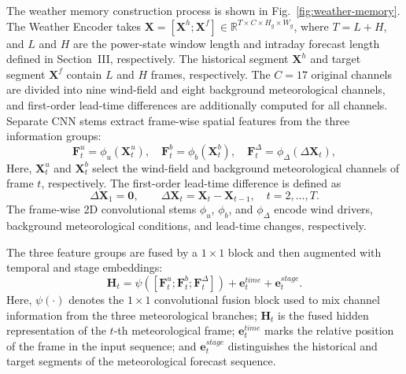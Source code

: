 The weather memory construction process is shown in Fig.~\ref{fig:weather-memory}. The Weather Encoder takes \(\mathbf{X}=[\mathbf{X}^{h};\mathbf{X}^{f}]\in\mathbb{R}^{T\times C\times H_g\times W_g}\), where \(T=L+H\), and \(L\) and \(H\) are the power-state window length and intraday forecast length defined in Section~III, respectively. The historical segment \(\mathbf{X}^{h}\) and target segment \(\mathbf{X}^{f}\) contain \(L\) and \(H\) frames, respectively. The \(C=17\) original channels are divided into nine wind-field and eight background meteorological channels, and first-order lead-time differences are additionally computed for all channels. Separate CNN stems extract frame-wise spatial features from the three information groups:
\begin{equation}
\mathbf{F}^{u}_{t}=\phi_{u}(\mathbf{X}^{u}_{t}),\quad
\mathbf{F}^{b}_{t}=\phi_{b}(\mathbf{X}^{b}_{t}),\quad
\mathbf{F}^{\Delta}_{t}=\phi_{\Delta}(\Delta\mathbf{X}_{t}),
\end{equation}
Here, \(\mathbf{X}^{u}_{t}\) and \(\mathbf{X}^{b}_{t}\) select the wind-field and background meteorological channels of frame \(t\), respectively. The first-order lead-time difference is defined as
\begin{equation}
\Delta\mathbf{X}_{1}=\mathbf{0},\qquad
\Delta\mathbf{X}_{t}=\mathbf{X}_{t}-\mathbf{X}_{t-1},\quad t=2,\ldots,T.
\end{equation}
The frame-wise 2D convolutional stems \(\phi_{u}\), \(\phi_{b}\), and \(\phi_{\Delta}\) encode wind drivers, background meteorological conditions, and lead-time changes, respectively.

The three feature groups are fused by a \(1\times1\) block and then augmented with temporal and stage embeddings:
\begin{equation}
\mathbf{H}_{t}=\psi([\mathbf{F}^{u}_{t};\mathbf{F}^{b}_{t};\mathbf{F}^{\Delta}_{t}])
+\mathbf{e}^{time}_{t}+\mathbf{e}^{stage}_{t}.
\end{equation}
Here, \(\psi(\cdot)\) denotes the \(1\times1\) convolutional fusion block used to mix channel information from the three meteorological branches; \(\mathbf{H}_{t}\) is the fused hidden representation of the \(t\)-th meteorological frame; \(\mathbf{e}^{time}_{t}\) marks the relative position of the frame in the input sequence; and \(\mathbf{e}^{stage}_{t}\) distinguishes the historical and target segments of the meteorological forecast sequence.

